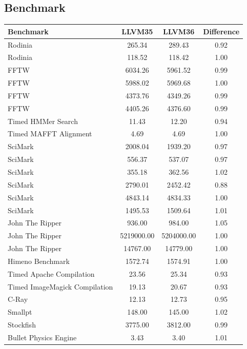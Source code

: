 \begin{appendix}
\section{Benchmark}

\begin{table}[htbp]
    \centering
    \begin{longtable}{l|c|c|c}
        \hline
        Benchmark & LLVM35 & LLVM36 & Difference \\
        \hline
        Rodinia & 265.34 & 289.43 & 0.92 \\
        Rodinia & 118.52 & 118.42 & 1.00 \\
        FFTW & 6034.26 & 5961.52 & 0.99 \\
        FFTW & 5988.02 & 5969.68 & 1.00 \\
        FFTW & 4373.76 & 4349.26 & 0.99 \\
        FFTW & 4405.26 & 4376.60 & 0.99 \\
        Timed HMMer Search & 11.43 & 12.20 & 0.94 \\
        Timed MAFFT Alignment & 4.69 & 4.69 & 1.00 \\
        SciMark & 2008.04 & 1939.20 & 0.97 \\
        SciMark & 556.37 & 537.07 & 0.97 \\
        SciMark & 355.18 & 362.56 & 1.02 \\
        SciMark & 2790.01 & 2452.42 & 0.88 \\
        SciMark & 4843.14 & 4834.33 & 1.00 \\
        SciMark & 1495.53 & 1509.64 & 1.01 \\
        John The Ripper & 936.00 & 984.00 & 1.05 \\
        John The Ripper & 5219000.00 & 5204000.00 & 1.00 \\
        John The Ripper & 14767.00 & 14779.00 & 1.00 \\
        Himeno Benchmark & 1572.74 & 1574.91 & 1.00 \\
        Timed Apache Compilation & 23.56 & 25.34 & 0.93 \\
        Timed ImageMagick Compilation & 19.13 & 20.67 & 0.93 \\
        C-Ray & 12.13 & 12.73 & 0.95 \\
        Smallpt & 148.00 & 145.00 & 1.02 \\
        Stockfish & 3775.00 & 3812.00 & 0.99 \\
        Bullet Physics Engine & 3.43 & 3.40 & 1.01 \\

\end{longtable}
\end{table}
\end{appendix}

